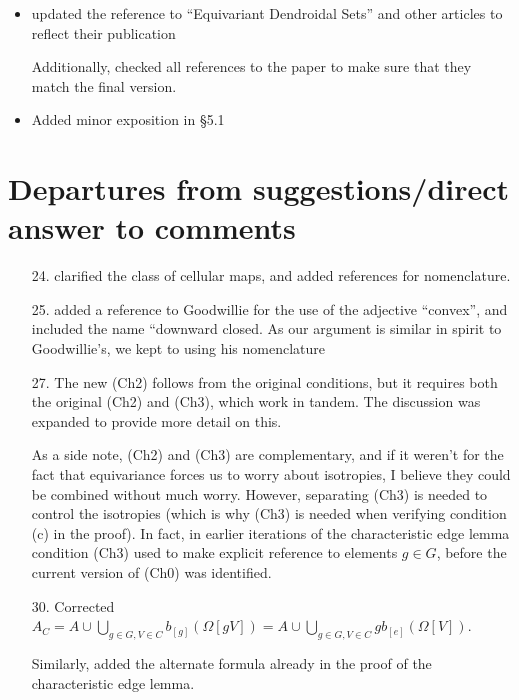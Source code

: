 \documentclass{article}
\begin{document}
\begin{itemize}
\item updated the reference to ``Equivariant Dendroidal Sets'' and other articles to reflect their publication

      Additionally, checked all references to the paper to make sure that they match the final version.
\item Added minor exposition in \S 5.1
\end{itemize}


\section{Departures from suggestions/direct answer to comments}

\begin{itemize}
\item[24.] clarified the class of cellular maps, and added references for nomenclature.
\item[25.] added a reference to Goodwillie for the use of the adjective ``convex'', and included the name ``downward closed. As our argument is similar in spirit to Goodwillie's, we kept to using his nomenclature

\item[27.] The new (Ch2) follows from the original conditions, but it requires both the original (Ch2) and (Ch3), which work in tandem. The discussion was expanded to provide more detail on this. 

As a side note, (Ch2) and (Ch3) are complementary, and if it weren't for the fact that equivariance forces us to worry about isotropies, I believe they could be combined without much worry.
However, separating (Ch3) is needed to control the isotropies (which is why (Ch3) is needed when verifying condition (c) in the proof). In fact, in earlier iterations of the characteristic edge lemma condition (Ch3) used to make explicit reference to elements $g \in G$, before the current version of (Ch0) was identified.

\item[30.] Corrected $A_C = A \cup \bigcup_{g\in G,V \in C} b_{[g]}(\Omega[gV]) = 
A \cup \bigcup_{g\in G,V \in C} g b_{[e]}(\Omega[V])$.

Similarly, added the alternate formula already in the proof of the characteristic edge lemma.


\end{itemize}
\end{document}
